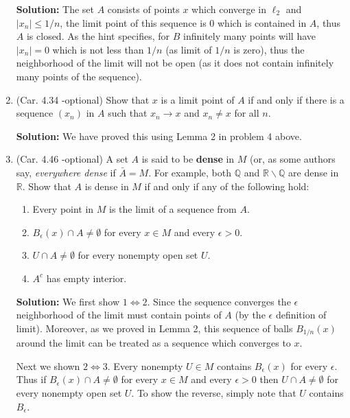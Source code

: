 \documentclass{article}
\def\le{\leqslant}
\def\to{\rightarrow}
\def\QQ{\mathbb Q}
\def\RR{\mathbb R}
\begin{document}
\begin{enumerate}
\textbf{Solution:} The set $A$ consists of points $x$ which converge in $\ell_2$ and $|x_n| \le 1/n$, the limit
point of this sequence is 0 which is contained in $A$, thus $A$ is closed.
As the hint specifies, for $B$ infinitely many points will have $|x_n|=0$ which is not less than  $1/n$ (as 
limit of $1/n$ is zero), thus the neighborhood
of the limit will not be open (as it does not contain infinitely many points of the sequence).


\item (Car. 4.34 -optional) Show that $x$ is a limit point of $A$ if and only if there is a sequence $(x_n)$ in $A$ such that $x_n \to x$ and $x_n \neq x$ for all $n$.

\textbf{Solution:} We have proved this using Lemma 2 in problem 4 above.


\item (Car. 4.46 -optional) A set $A$ is said to be \textbf{dense} in $M$ (or, as some authors say, \textit{everywhere dense} if $\bar{A} = M$. For example, both $\QQ$ and $\RR \backslash \QQ$ are dense in $\RR$. Show that $A$ is dense in $M$ if and only if any of the following hold:
\begin{enumerate}
\item Every point in $M$ is the limit of a sequence from $A$.
\item $B_{\epsilon}(x) \cap A \neq \emptyset$ for every $x \in M$ and every $\epsilon > 0$.
\item $U \cap A \neq \emptyset$ for every nonempty open set $U$.
\item $A^c$ has empty interior.
\end{enumerate}

\textbf{Solution:} We first show $1 \iff 2$. Since the sequence converges the $\epsilon$ neighborhood of the limit
must contain points of $A$ (by the $\epsilon$ definition of limit). Moreover, as we proved in Lemma 2, this sequence
of balls $B_{1/n}(x)$ around the limit can be treated as a sequence which converges to $x$.

Next we shown $2 \iff 3$. Every nonempty $U\in M$ contains $B_\epsilon(x)$ for every $\epsilon$.
Thus if $B_{\epsilon}(x) \cap A \neq \emptyset$ for every $x \in M$ and every $\epsilon > 0$ then 
$U \cap A \neq \emptyset$ for every nonempty open set $U$. To show the reverse, simply note that $U$ contains
$B_\epsilon$. 


\end{enumerate}
\end{document}
